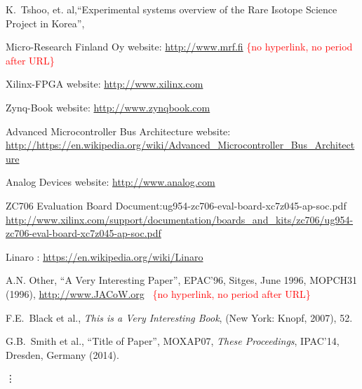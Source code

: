 \documentclass[a4paper,
              ]{jacow}
\begin{document}
\begin{thebibliography}{9}   %

 K.~Tshoo,{ et. al},``Experimental systems overview of the Rare Isotope Science Project in Korea'',

	Micro-Research Finland Oy website:
	\url{http://www.mrf.fi}%
	\hfill\textcolor{red}{\{no hyperlink, no period after URL\}}


Xilinx-FPGA website:
\url{http://www.xilinx.com}

Zynq-Book website:
\url{http://www.zynqbook.com}


Advanced Microcontroller Bus Architecture website:
\url{http://https://en.wikipedia.org/wiki/Advanced_Microcontroller_Bus_Architecture}


Analog Devices website:
\url{http://www.analog.com}

ZC706 Evaluation Board Document:ug954-zc706-eval-board-xc7z045-ap-soc.pdf
\url{http://www.xilinx.com/support/documentation/boards_and_kits/zc706/ug954-zc706-eval-board-xc7z045-ap-soc.pdf}

Linaro :
\url{https://en.wikipedia.org/wiki/Linaro}


	A.N. Other,
	``A Very Interesting Paper'',
	EPAC'96, Sitges, June 1996, MOPCH31 (1996),
	\url{http://www.JACoW.org}\newline \mbox{ } \hfill\textcolor{red}{\{no hyperlink, no period after URL\}}

	F.E.~Black et al.,
	\textit{This is a Very Interesting Book},
	(New York: Knopf, 2007), 52.

    G.B.~Smith et al., ``Title of Paper'',
    MOXAP07, \textit{These Proceedings}, IPAC'14, Dresden, Germany (2014).

	\hspace*{-1.1em}\mbox{\vdots}


\end{thebibliography}

\fi
\end{document}

